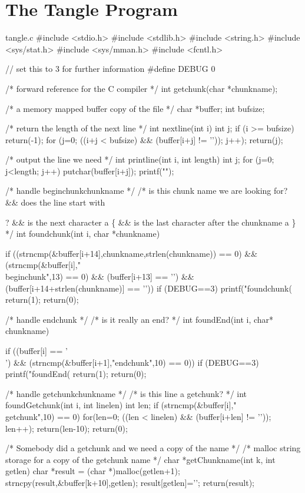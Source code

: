 \chapter{The Tangle Program}
\begin{chunk}{tangle.c}
#include <stdio.h>
#include <stdlib.h>
#include <string.h>
#include <sys/stat.h>
#include <sys/mman.h>
#include <fcntl.h>

// set this to 3 for further information
#define DEBUG 0

/* forward reference for the C compiler */
int getchunk(char *chunkname);

/* a memory mapped buffer copy of the file */
char *buffer;
int bufsize;

/* return the length of the next line */
int nextline(int i) {
  int j;
  if (i >= bufsize) return(-1);
  for (j=0; ((i+j < bufsize) && (buffer[i+j] != '\n')); j++);
  return(j);
}

/* output the line we need */
int printline(int i, int length) {
  int j;
  for (j=0; j<length; j++) { putchar(buffer[i+j]); }
  printf("\n");
}

/* handle begin{chunk}{chunkname}        */
/* is this chunk name we are looking for? &&
   does the line start with \begin{chunk}? &&
   is the next character a \{ &&
   is the last character after the chunkname a \}
*/
int foundchunk(int i, char *chunkname) {
  if ((strncmp(&buffer[i+14],chunkname,strlen(chunkname)) == 0) &&
      (strncmp(&buffer[i],"\\begin{chunk}",13) == 0) &&
      (buffer[i+13] == '{') &&
      (buffer[i+14+strlen(chunkname)] == '}')) {
    if (DEBUG==3) { printf("foundchunk(%
    return(1); 
  }
  return(0);
}

/* handle end{chunk}   */
/* is it really an end? */
int foundEnd(int i, char* chunkname) {
  if ((buffer[i] == '\\') && 
      (strncmp(&buffer[i+1],"end{chunk}",10) == 0)) {
    if (DEBUG==3) { printf("foundEnd(%
    return(1); 
  }
  return(0);
}

/* handle getchunk{chunkname} */
/* is this line a getchunk?    */
int foundGetchunk(int i, int linelen) {
  int len;
  if (strncmp(&buffer[i],"\\getchunk{",10) == 0) {
    for(len=0; ((len < linelen) && (buffer[i+len] != '}')); len++);
    return(len-10);
  }
  return(0);
}

/* Somebody did a getchunk and we need a copy of the name */
/* malloc string storage for a copy of the getchunk name  */
char *getChunkname(int k, int getlen) {
  char *result = (char *)malloc(getlen+1);
  strncpy(result,&buffer[k+10],getlen);
  result[getlen]='\0';
  return(result);
}
  
}}
\end{chunk}
\end{chunk}
